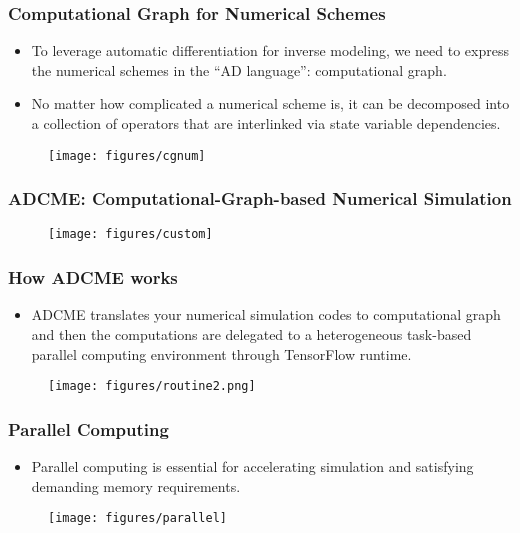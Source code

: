 \documentclass[usenames,dvipsnames]{beamer}
\begin{document}
\begin{frame}
	\frametitle{Computational Graph for Numerical Schemes}
	
	\begin{itemize}
		\item To leverage automatic differentiation for inverse modeling, we need to express the numerical schemes in the ``AD language'': computational graph. 
		\item No matter how complicated a numerical scheme is, it can be decomposed into a collection of operators that are interlinked via state variable dependencies. 
	\end{itemize}
	
	\begin{figure}[hbt]
		\texttt{[image: figures/cgnum]}
	\end{figure}
	
	
	
\end{frame}


\begin{frame}
	\frametitle{ADCME: Computational-Graph-based Numerical Simulation}
	
	\begin{figure}[hbt]
		\texttt{[image: figures/custom]}
	\end{figure}
\end{frame}

\begin{frame}
\frametitle{How ADCME works}
\begin{itemize}
	\item ADCME translates your numerical simulation codes to computational graph and then the computations are delegated to a heterogeneous task-based parallel computing environment through TensorFlow runtime. 
\end{itemize}
\begin{figure}[hbt]
	\texttt{[image: figures/routine2.png]}
\end{figure}
\end{frame}

\begin{frame}
	\frametitle{Parallel Computing}
	\begin{itemize}
		\item Parallel computing is essential for accelerating simulation and satisfying demanding memory requirements.
	\end{itemize}
	\begin{figure}[hbt]
		\texttt{[image: figures/parallel]}
	\end{figure}
\end{frame}
\end{document}
